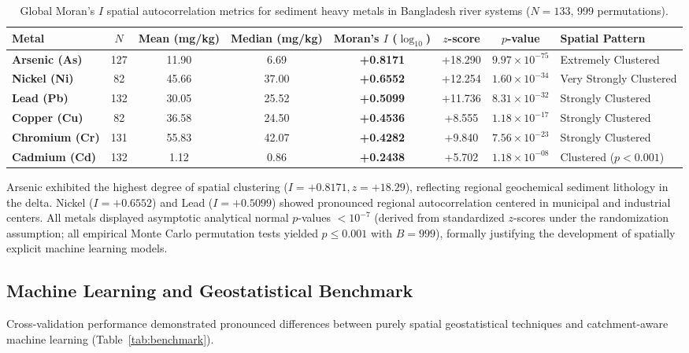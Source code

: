 \documentclass[authoryear,preprint,12pt]{elsarticle}
\begin{document}
\begin{table}[htbp]
\centering
\small
\caption{Global Moran's $I$ spatial autocorrelation metrics for sediment heavy metals in Bangladesh river systems ($N=133$, 999 permutations).}
\label{tab:moran}
\begin{tabularx}{\textwidth}{lccccccX}
\toprule
Metal & $N$ & Mean (mg/kg) & Median (mg/kg) & Moran's $I$ ($\log_{10}$) & $z$-score & $p$-value & Spatial Pattern \\
\midrule
\textbf{Arsenic (As)} & 127 & 11.90 & 6.69 & \textbf{+0.8171} & +18.290 & $9.97 \times 10^{-75}$ & Extremely Clustered \\
\textbf{Nickel (Ni)} & 82 & 45.66 & 37.00 & \textbf{+0.6552} & +12.254 & $1.60 \times 10^{-34}$ & Very Strongly Clustered \\
\textbf{Lead (Pb)} & 132 & 30.05 & 25.52 & \textbf{+0.5099} & +11.736 & $8.31 \times 10^{-32}$ & Strongly Clustered \\
\textbf{Copper (Cu)} & 82 & 36.58 & 24.50 & \textbf{+0.4536} & +8.555 & $1.18 \times 10^{-17}$ & Strongly Clustered \\
\textbf{Chromium (Cr)} & 131 & 55.83 & 42.07 & \textbf{+0.4282} & +9.840 & $7.56 \times 10^{-23}$ & Strongly Clustered \\
\textbf{Cadmium (Cd)} & 132 & 1.12 & 0.86 & \textbf{+0.2438} & +5.702 & $1.18 \times 10^{-08}$ & Clustered ($p < 0.001$) \\
\bottomrule
\end{tabularx}
\end{table}

Arsenic exhibited the highest degree of spatial clustering ($I = +0.8171, z = +18.29$), reflecting regional geochemical sediment lithology in the delta. Nickel ($I = +0.6552$) and Lead ($I = +0.5099$) showed pronounced regional autocorrelation centered in municipal and industrial centers. All metals displayed asymptotic analytical normal $p$-values $< 10^{-7}$ (derived from standardized $z$-scores under the randomization assumption; all empirical Monte Carlo permutation tests yielded $p \le 0.001$ with $B=999$), formally justifying the development of spatially explicit machine learning models.

\subsection{Machine Learning and Geostatistical Benchmark}
Cross-validation performance demonstrated pronounced differences between purely spatial geostatistical techniques and catchment-aware machine learning (Table~\ref{tab:benchmark}).
\end{document}
